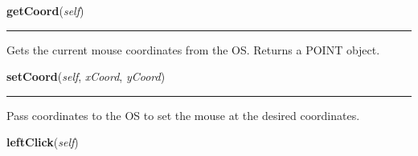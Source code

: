 \hspace{.8\funcindent}\begin{boxedminipage}{\funcwidth}

    \raggedright \textbf{getCoord}(\textit{self})

    \vspace{-1.5ex}

    \rule{\textwidth}{0.5\fboxrule}
\setlength{\parskip}{2ex}
    Gets the current mouse coordinates from the OS. Returns a POINT object.

\setlength{\parskip}{1ex}
    \end{boxedminipage}

    \label{GUIRobot:Source:Virtual_HID:VMouse:setCoord}

    \vspace{0.5ex}

\hspace{.8\funcindent}\begin{boxedminipage}{\funcwidth}

    \raggedright \textbf{setCoord}(\textit{self}, \textit{xCoord}, \textit{yCoord})

    \vspace{-1.5ex}

    \rule{\textwidth}{0.5\fboxrule}
\setlength{\parskip}{2ex}
    Pass coordinates to the OS to set the mouse at the desired coordinates.

\setlength{\parskip}{1ex}
    \end{boxedminipage}

    \label{GUIRobot:Source:Virtual_HID:VMouse:leftClick}

    \vspace{0.5ex}

\hspace{.8\funcindent}\begin{boxedminipage}{\funcwidth}

    \raggedright \textbf{leftClick}(\textit{self})

\setlength{\parskip}{2ex}
\setlength{\parskip}{1ex}
    \end{boxedminipage}

